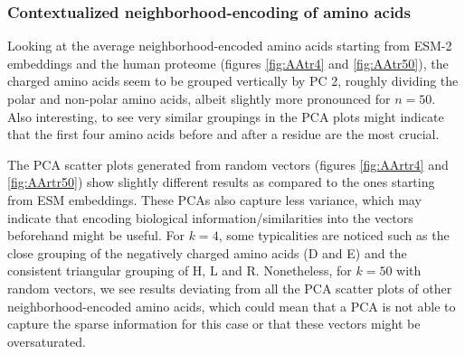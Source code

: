 \subsubsection*{Contextualized neighborhood-encoding of amino acids}
Looking at the average neighborhood-encoded amino acids starting from ESM-2 embeddings and the human proteome (figures \ref{fig:AAtr4} and \ref{fig:AAtr50}), the charged amino acids seem to be grouped vertically by PC 2, roughly dividing the polar and non-polar amino acids, albeit slightly more pronounced for $n = 50$. Also interesting, to see very similar groupings in the PCA plots might indicate that the first four amino acids before and after a residue are the most crucial.

The PCA scatter plots generated from random vectors (figures \ref{fig:AArtr4} and \ref{fig:AArtr50}) show slightly different results as compared to the ones starting from ESM embeddings. These PCAs also capture less variance, which may indicate that encoding biological information/similarities into the vectors beforehand might be useful. For $k = 4$, some typicalities are noticed such as the close grouping of the negatively charged amino acids (D and E) and the consistent triangular grouping of H, L and R. Nonetheless, for $k = 50$ with random vectors, we see results deviating from all the PCA scatter plots of other neighborhood-encoded amino acids, which could mean that a PCA is not able to capture the sparse information for this case or that these vectors might be oversaturated.

